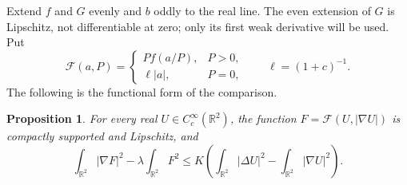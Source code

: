\documentclass[11pt,letterpaper,reqno]{amsart}
\newtheorem{proposition}[theorem]{Proposition}
\theoremstyle{definition}
\begin{document}
Extend $f$ and $G$ evenly and $b$ oddly to the real line. The even
extension of $G$ is Lipschitz, not differentiable at zero; only its
first weak derivative will be used. Put
\[
 \mathcal F(a,P)=
 \begin{cases}P f(a/P),&P>0,\\ \ell|a|,&P=0,\end{cases}
 \qquad \ell=(1+c)^{-1}.
\]
The following is the functional form of the comparison.
\begin{proposition}\label{prop:functional}
For every real $U\in C_c^\infty(\mathbb R^2)$, the function
$F=\mathcal F(U,|\nabla U|)$ is compactly supported and Lipschitz, and
\begin{equation}\label{functional}
 \int_{\mathbb R^2}|\nabla F|^2-\lambda\int_{\mathbb R^2}F^2
 \le K\left(\int_{\mathbb R^2}|\Delta U|^2
                     -\int_{\mathbb R^2}|\nabla U|^2\right).
\end{equation}
\end{proposition}
\end{document}
